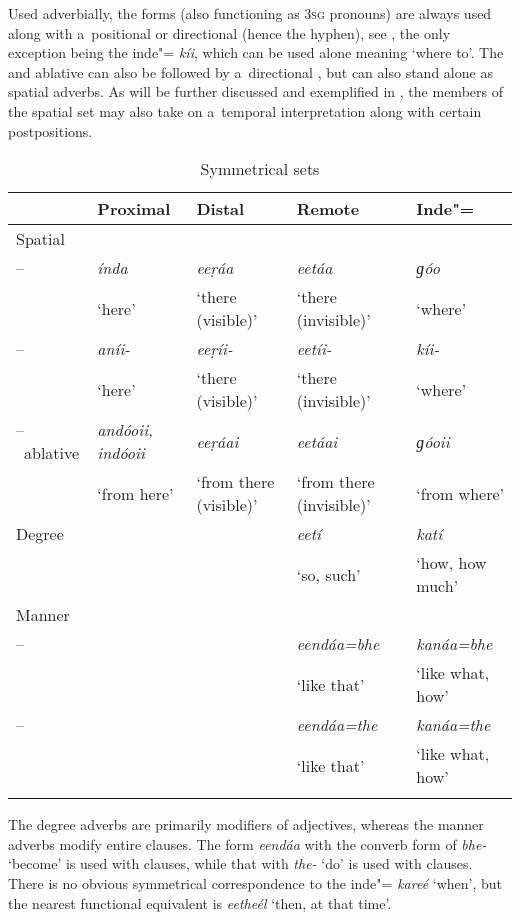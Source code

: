 Used adverbially, the  forms (also functioning as \textsc{3sg}  pronouns) are always used
along with a~positional or directional  (hence the hyphen), see , the only
exception being the inde"= \textit{kíi}, which can be used alone meaning
`where to'. The  and ablative can also be followed by a~directional , but can
also stand alone as spatial adverbs. As will be further discussed and exemplified in , the
members of the spatial set may also take on a~temporal interpretation along with certain
postpositions.


\begin{table}[ht]
\caption{Symmetrical  sets}
\begin{tabularx}{\textwidth}{ l Q Q Q Q }
\lsptoprule
&
Proximal &
Distal &
Remote &
Inde"=\\\midrule
Spatial &
&
&
&
\\
--~ &
\textit{índa} &
\textit{eeṛáa} &
\textit{eetáa} &
\textit{ɡóo} \\
&
`here' &
`there (visible)' &
`there (invisible)' &
`where'\\
--~ &
\textit{aníi-} &
\textit{eeṛíi-} &
\textit{eetíi-} &
\textit{kíi-} \\
&
`here' &
`there (visible)' &
`there (invisible)' &
`where'\\
--~ablative &
\textit{andóoii, indóoii} &
\textit{eeṛáai} &
\textit{eetáai} &
\textit{ɡóoii} \\
&
`from here' &
`from there (visible)' &
`from there (invisible)' &
`from where'\\
Degree &
&
&
\textit{eetí} &
\textit{katí} \\
&
&
&
`so, such' &
`how, how much'\\
Manner &
&
&
&
\\
--~ &
&
&
\textit{eendáa=bhe} &
\textit{kanáa=bhe} \\
&
&
&
`like that' &
`like what, how'\\
--~ &
&
&
\textit{eendáa=the} &
\textit{kanáa=the} \\
&
&
&
`like that' &
`like what, how'\\\lspbottomrule
\end{tabularx}
\label{tab:7-1}
\end{table}

The degree adverbs are primarily modifiers of adjectives, whereas the manner adverbs modify entire clauses. The form \textit{eendáa} with the converb form of \textit{bhe-} `become' is used with  clauses, while that with \textit{the-} `do' is used with  clauses. There is no obvious symmetrical correspondence to the inde"=  \textit{kareé} `when', but the nearest functional equivalent is \textit{eetheél} `then, at that time'. 

